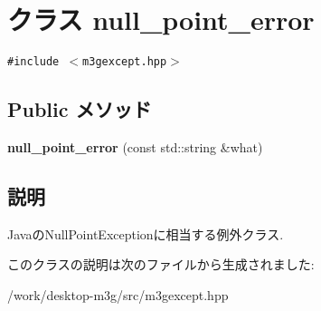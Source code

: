 \hypertarget{classm3g_1_1null__point__error}{
\section{クラス null\_\-point\_\-error}
\label{classm3g_1_1null__point__error}
}
{\tt \#include $<$m3gexcept.hpp$>$}

\subsection*{Public メソッド}
\begin{CompactItemize}
\item 
\hypertarget{classm3g_1_1null__point__error_69fa4667be16b17cab9037f573a9ff59}{
\textbf{null\_\-point\_\-error} (const std::string \&what)}
\label{classm3g_1_1null__point__error_69fa4667be16b17cab9037f573a9ff59}

\end{CompactItemize}


\subsection{説明}
JavaのNullPointExceptionに相当する例外クラス. 

このクラスの説明は次のファイルから生成されました:\begin{CompactItemize}
\item 
/work/desktop-m3g/src/m3gexcept.hpp\end{CompactItemize}
